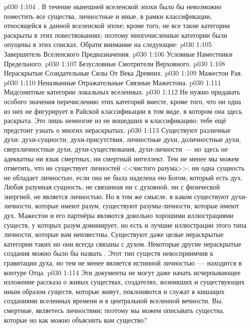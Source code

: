 \vs p030 1:104 . В течение нынешней вселенской эпохи было бы невозможно поместить все существа, личностные и иные, в рамки классификации, относящейся к данной вселенской эпохе; кроме того, не все такие категории раскрыты в этих повествованиях; поэтому многочисленные категории были опущены в этих списках. Обрати внимание на следующие:
\vs p030 1:105 Завершитель Вселенского Предназначения.
\vs p030 1:106 Условные Наместники Предельного.
\vs p030 1:107 Безусловные Смотрители Верховного.
\vs p030 1:108 Нераскрытые Созидательные Силы От Века Древних.
\vs p030 1:109 Мажестон Рая.
\vs p030 1:110 Неназванные Отражательные Связные Мажестона.
\vs p030 1:111 Мидсонитные категории локальных вселенных.
\vs p030 1:112 \pc Не нужно придавать особого значения перечислению этих категорий вместе, кроме того, что ни одна из них не фигурирует в Райской классификации в том виде, в котором она здесь раскрыта. Это лишь немногие из не вошедших в классификацию; тебе ещё предстоит узнать о многих нераскрытых.
\vs p030 1:113 Существуют различные духи: духи\hyp{}сущности, духи\hyp{}присутствия, личностные духи, доличностные духи, сверхличностные духи, духи\hyp{}существования, духи\hyp{}личности~--- но здесь не адекватны ни язык смертных, ни смертный интеллект. Тем не менее мы можем отметить, что не существует личностей <<чистого разума>>; ни одна сущность не обладает личностью, если она не была наделена ею Богом, который есть дух. Любая разумная сущность, не связанная ни с духовной, ни с физической энергией, не является личностью. Но в том же смысле, в каком существуют духи\hyp{}личности, которые имеют разум, существуют разумы\hyp{}личности, которые имеют дух. Мажестон и его партнёры являются довольно хорошими иллюстрациями существ, у которых разум доминирует, но есть и лучшие иллюстрации этого типа личности, которые вам неизвестны. Существуют даже целые нераскрытые категории таких  но они всегда связаны с духом. Некоторые другие нераскрытые создания можно было бы назвать . Этот тип существ невосприимчив к гравитации духа, но тем не менее является истинной личностью~--- находится в контуре Отца.
\vs p030 1:114 \pc Эти документы не могут даже начать исчерпывающее изложение рассказа о живых существах, создателях, возникших и существующих иным образом существ, которые живут, поклоняются и служат в кишащих созданиями вселенных времени и в центральной вселенной вечности. Вы, смертные, являетесь личностями; поэтому мы можем описывать существа, которые  но как можно объяснить вам  существо?
